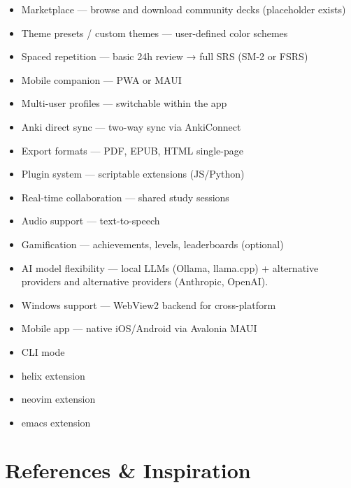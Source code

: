\documentclass[14pt]{article}
\begin{document}
\begin{itemize}
\item Marketplace — browse and download community decks (placeholder exists)
\item Theme presets / custom themes — user-defined color schemes
\item Spaced repetition — basic 24h review → full SRS (SM-2 or FSRS)
\item Mobile companion — PWA or MAUI
\item Multi-user profiles — switchable within the app
\item Anki direct sync — two-way sync via AnkiConnect
\item Export formats — PDF, EPUB, HTML single-page
\item Plugin system — scriptable extensions (JS/Python)
\item Real-time collaboration — shared study sessions
\item Audio support — text-to-speech
\item Gamification — achievements, levels, leaderboards (optional)
\item AI model flexibility — local LLMs (Ollama, llama.cpp) + alternative providers
and alternative providers (Anthropic, OpenAI).
\item Windows support — WebView2 backend for cross-platform
\item Mobile app — native iOS/Android via Avalonia MAUI
\item CLI mode
\item helix extension
\item neovim extension
\item emacs extension
\end{itemize}


\newpage
\section{References \& Inspiration}
\label{sec:orgb7ba43e}
\end{document}
